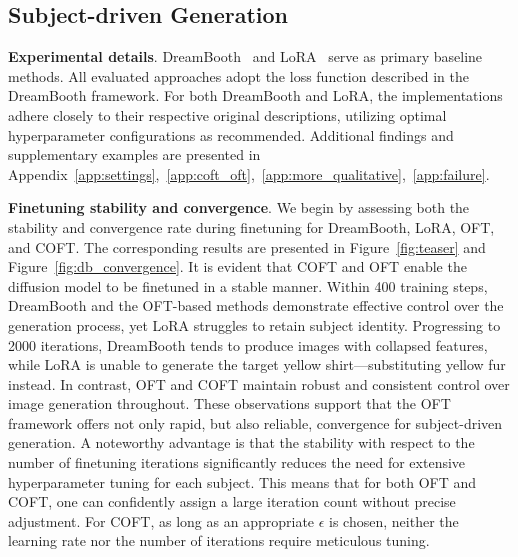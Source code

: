 \subsection{Subject-driven Generation}

\textbf{Experimental details}. DreamBooth~\cite{ruiz2023dreambooth} and LoRA~\cite{hulora2022} serve as primary baseline methods. All evaluated approaches adopt the loss function described in the DreamBooth framework. For both DreamBooth and LoRA, the implementations adhere closely to their respective original descriptions, utilizing optimal hyperparameter configurations as recommended. Additional findings and supplementary examples are presented in Appendix~\ref{app:settings},~\ref{app:coft_oft},~\ref{app:more_qualitative},~\ref{app:failure}.

\textbf{Finetuning stability and convergence}. We begin by assessing both the stability and convergence rate during finetuning for DreamBooth, LoRA, OFT, and COFT. The corresponding results are presented in Figure~\ref{fig:teaser} and Figure~\ref{fig:db_convergence}. It is evident that COFT and OFT enable the diffusion model to be finetuned in a stable manner. Within 400 training steps, DreamBooth and the OFT-based methods demonstrate effective control over the generation process, yet LoRA struggles to retain subject identity. Progressing to 2000 iterations, DreamBooth tends to produce images with collapsed features, while LoRA is unable to generate the target yellow shirt—substituting yellow fur instead. In contrast, OFT and COFT maintain robust and consistent control over image generation throughout. These observations support that the OFT framework offers not only rapid, but also reliable, convergence for subject-driven generation. A noteworthy advantage is that the stability with respect to the number of finetuning iterations significantly reduces the need for extensive hyperparameter tuning for each subject. This means that for both OFT and COFT, one can confidently assign a large iteration count without precise adjustment. For COFT, as long as an appropriate $\epsilon$ is chosen, neither the learning rate nor the number of iterations require meticulous tuning.

